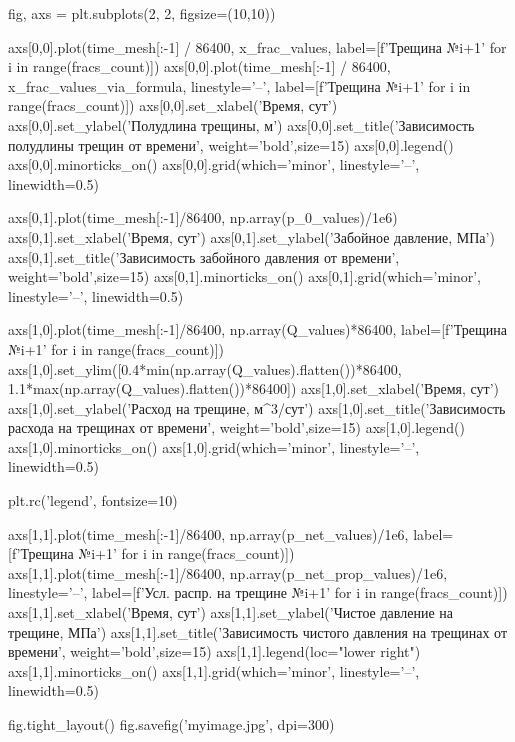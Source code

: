 \begin{pythoncode}
fig, axs = plt.subplots(2, 2, figsize=(10,10))

axs[0,0].plot(time_mesh[:-1] / 86400, x_frac_values,
              label=[f'Трещина №{i+1}' for i in range(fracs_count)])
axs[0,0].plot(time_mesh[:-1] / 86400, x_frac_values_via_formula,
              linestyle='--', label=[f'Трещина №{i+1}'
                                     for i in range(fracs_count)])
axs[0,0].set_xlabel('Время, сут')
axs[0,0].set_ylabel('Полудлина трещины, м')
axs[0,0].set_title('Зависимость полудлины трещин \n от времени',
                   weight='bold',size=15)
axs[0,0].legend()
axs[0,0].minorticks_on()
axs[0,0].grid(which='minor', linestyle='--', linewidth=0.5)

axs[0,1].plot(time_mesh[:-1]/86400, np.array(p_0_values)/1e6)
axs[0,1].set_xlabel('Время, сут')
axs[0,1].set_ylabel('Забойное давление, МПа')
axs[0,1].set_title('Зависимость забойного давления \n от времени',
                   weight='bold',size=15)
axs[0,1].minorticks_on()
axs[0,1].grid(which='minor', linestyle='--', linewidth=0.5)

axs[1,0].plot(time_mesh[:-1]/86400, np.array(Q_values)*86400,
              label=[f'Трещина №{i+1}' for i in range(fracs_count)])
axs[1,0].set_ylim([0.4*min(np.array(Q_values).flatten())*86400,
                   1.1*max(np.array(Q_values).flatten())*86400])
axs[1,0].set_xlabel('Время, сут')
axs[1,0].set_ylabel('Расход на трещине, м^3/сут')
axs[1,0].set_title('Зависимость расхода на трещинах \n от времени',
                   weight='bold',size=15)
axs[1,0].legend()
axs[1,0].minorticks_on()
axs[1,0].grid(which='minor', linestyle='--', linewidth=0.5)

plt.rc('legend', fontsize=10)

axs[1,1].plot(time_mesh[:-1]/86400, np.array(p_net_values)/1e6,
              label=[f'Трещина №{i+1}' for i in range(fracs_count)])
axs[1,1].plot(time_mesh[:-1]/86400, np.array(p_net_prop_values)/1e6,
              linestyle='--',
              label=[f'Усл. распр. на трещине №{i+1}'
                     for i in range(fracs_count)])
axs[1,1].set_xlabel('Время, сут')
axs[1,1].set_ylabel('Чистое давление на трещине, МПа')
axs[1,1].set_title('Зависимость чистого давления на трещинах \n от времени',
                   weight='bold',size=15)
axs[1,1].legend(loc="lower right")
axs[1,1].minorticks_on()
axs[1,1].grid(which='minor', linestyle='--', linewidth=0.5)

fig.tight_layout()
fig.savefig('myimage.jpg', dpi=300)
\end{pythoncode}


